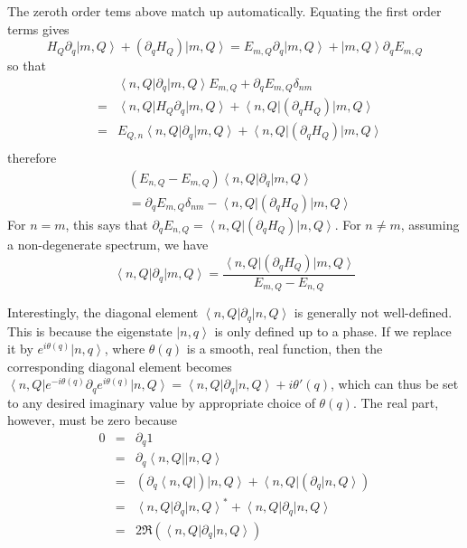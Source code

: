 \documentclass[aps,twocolumn,prb,floatfix,amsmath,amssymb,groupedaddress]{revtex4}
\begin{document}
The zeroth order tems above match up automatically.  Equating the first order terms gives
\[\!\!\!\!\!H_Q\partial_q\left|m,Q\right> + \left(\partial_qH_Q\right)\left|m,Q\right> = E_{m,Q}\partial_q\left|m,Q\right> + \left|m,Q\right>\partial_q E_{m,Q}\]
so that
\begin{eqnarray*}
& & \left<n,Q\right|\partial_q\left|m,Q\right> E_{m,Q} + \partial_q E_{m,Q} \delta_{nm} \\
& = & \left<n,Q\right|H_Q\partial_q\left|m,Q\right> + \left<n,Q\right|\left(\partial_q H_Q\right)\left|m,Q\right> \\
& = & E_{Q,n}\left<n,Q\right|\partial_q\left|m,Q\right> + \left<n,Q\right|\left(\partial_q H_Q\right)\left|m,Q\right> \\
\end{eqnarray*}
therefore
\begin{eqnarray*}
& \left(E_{n,Q}-E_{m,Q}\right) \left<n,Q\right|\partial_q\left|m,Q\right> \\
 & = \partial_q E_{m,Q}\delta_{nm}-\left<n,Q\right|\left(\partial_q H_Q\right)\left|m,Q\right>
\end{eqnarray*}
For $n=m$, this says that $\partial_q E_{n,Q} = \left<n,Q\right|\left(\partial_q H_Q\right)\left|n,Q\right>$.  For $n\neq m$, assuming a non-degenerate spectrum, we have 
\begin{equation}
\left<n,Q\right|\partial_q\left|m,Q\right> = \frac{\left<n,Q\right|\left(\partial_q H_Q\right)\left|m,Q\right>}{E_{m,Q}-E_{n,Q}}
\end{equation}

Interestingly, the diagonal element $\left<n,Q\right|\partial_q\left|n,Q\right>$ is generally not well-defined.  This is because the eigenstate $\left|n,q\right>$ is only defined up to a phase.  If we replace it by $e^{i\theta(q)}\left|n,q\right>$, where $\theta(q)$ is a smooth, real function, then the corresponding diagonal element becomes $\left<n,Q\right|e^{-i\theta(q)}\partial_qe^{i\theta(q)}\left|n,Q\right> = \left<n,Q\right|\partial_q\left|n,Q\right> + i\theta'(q)$, which can thus be set to any desired imaginary value by appropriate choice of $\theta(q)$.  The real part, however, must be zero because 
\begin{eqnarray*}
0 & = & \partial_q 1 \\
& = & \partial_q \left<n,Q\right|\left|n,Q\right> \\
& = & \left( \partial_q \left<n,Q\right|\right)\left|n,Q\right> + \left<n,Q\right|\left( \partial_q\left|n,Q\right>\right) \\
& = & \left<n,Q\right|\partial_q\left|n,Q\right>^* + \left<n,Q\right|\partial_q\left|n,Q\right> \\
& = & 2 \Re\left( \left<n,Q\right|\partial_q\left|n,Q\right>\right)
\end{eqnarray*}
\end{document}
